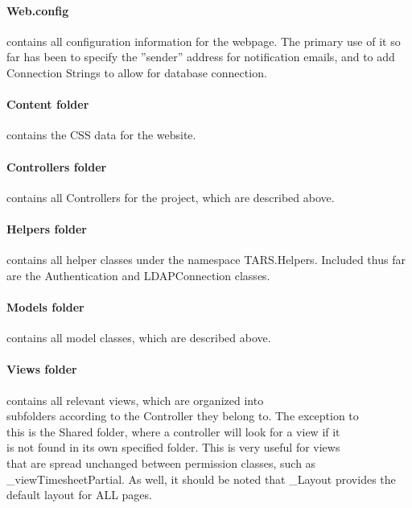 \documentclass[letterpaper]{article}
\begin{document}
{\paragraph{Web.config} contains all configuration information for the webpage. The primary use of it so far has been to specify the ''sender'' address for notification emails, and to add Connection Strings to allow for database connection.
\paragraph{Content folder} contains the CSS data for the website.
\paragraph{Controllers folder} contains all Controllers for the project, which are described above.
\paragraph{Helpers folder} contains all helper classes under the namespace TARS.Helpers. Included thus far are the Authentication and LDAPConnection classes.
\paragraph{Models folder} contains all model classes, which are described above.
\paragraph{Views folder} contains all relevant views, which are organized into 
\\subfolders according to the Controller they belong to. The exception to
\\this is the Shared folder, where a controller will look for a view if it
\\is not found in its own specified folder. This is very useful for views 
\\that are spread unchanged between permission classes, such as 
\\\_viewTimesheetPartial. As well, it should be noted that \_Layout provides the
\\default layout for ALL pages.
}
\pagebreak
\end{document}
